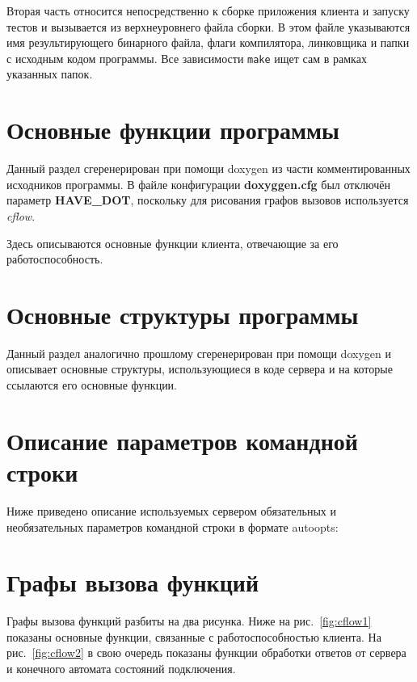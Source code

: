 \documentclass[a4paper,12pt]{report}
\begin{document}
Вторая часть относится непосредственно к сборке приложения клиента и запуску тестов и вызывается из верхнеуровнего файла сборки. В этом файле указываются имя результирующего бинарного файла, флаги компилятора, линковщика и папки с исходным кодом программы. Все зависимости \texttt{make} ищет сам в рамках указанных папок.


\section{Основные функции программы}

Данный раздел сгеренерирован при помощи doxygen из части комментированных исходников программы. В файле конфигурации \textbf{doxyggen.cfg} был отключён параметр \textbf{HAVE\_DOT}, поскольку для рисования графов вызовов используется \textit{cflow}.

Здесь описываются основные функции клиента, отвечающие за его работоспособность.




\section{Основные структуры программы}

Данный раздел аналогично прошлому сгеренерирован при помощи doxygen и описывает основные структуры, использующиеся в коде сервера и на которые ссылаются его основные функции.

%
%
%


\section{Описание параметров командной строки}

Ниже приведено описание используемых сервером обязательных и необязательных параметров командной строки в формате autoopts:



\section{Графы вызова функций}

Графы вызова функций разбиты на два рисунка. Ниже на рис.~\ref{fig:cflow1} показаны основные функции, связанные с работоспособностью клиента. На рис.~\ref{fig:cflow2} в свою очередь показаны функции обработки ответов от сервера и конечного автомата состояний подключения.
\end{document}
